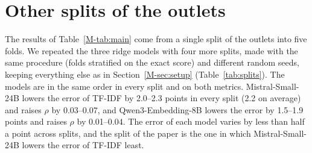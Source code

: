 \documentclass[11pt,a4paper]{article}
\begin{document}
\begin{table}[h]
\centering
\caption{More metrics per outlet (226 outlets, all articles), with 95\% bootstrap intervals.}\label{tab:more}
\end{table}

\section{Other splits of the outlets}\label{app:splits}
The results of Table~\ref{M-tab:main} come from a single split of the outlets into five folds. We repeated the three
ridge models with four more splits, made with the same procedure (folds stratified on the exact score) and different
random seeds, keeping everything else as in Section~\ref{M-sec:setup} (Table~\ref{tab:splits}). The models are in the
same order in every split and on both metrics. Mistral-Small-24B lowers the error of TF-IDF by 2.0--2.3 points in every
split (2.2 on average) and raises $\rho$ by 0.03--0.07, and Qwen3-Embedding-8B lowers the error by 1.5--1.9 points and
raises $\rho$ by 0.01--0.04. The error of each model varies by less than half a point across splits, and the split of
the paper is the one in which Mistral-Small-24B lowers the error of TF-IDF least.
\end{document}
